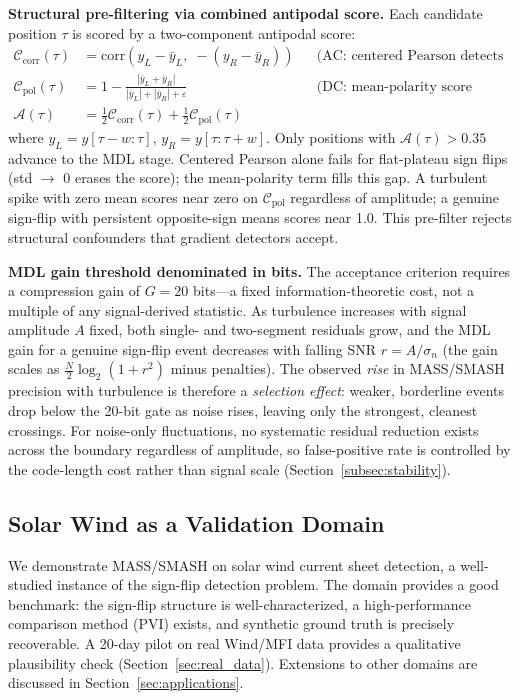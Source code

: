 \documentclass[12pt,letterpaper]{article}
\begin{document}
\textbf{Structural pre-filtering via combined antipodal score.}
Each candidate position $\tau$ is scored by a two-component antipodal score:
\begin{align*}
  \mathcal{C}_{\mathrm{corr}}(\tau) &= \mathrm{corr}(y_L - \bar{y}_L,\;{-}(y_R - \bar{y}_R))
    &&\text{(AC: centered Pearson detects oscillatory antipodal structure)}\\
  \mathcal{C}_{\mathrm{pol}}(\tau)  &= 1 - \tfrac{|\bar{y}_L + \bar{y}_R|}{|\bar{y}_L| + |\bar{y}_R| + \varepsilon}
    &&\text{(DC: mean-polarity score detects flat-plateau sign flips)}\\
  \mathcal{A}(\tau) &= \tfrac{1}{2}\mathcal{C}_{\mathrm{corr}}(\tau) + \tfrac{1}{2}\mathcal{C}_{\mathrm{pol}}(\tau)
\end{align*}
where $y_L = y[\tau-w:\tau]$, $y_R = y[\tau:\tau+w]$.
Only positions with $\mathcal{A}(\tau) > 0.35$ advance to the MDL stage.
Centered Pearson alone fails for flat-plateau sign flips (std $\to$ 0 erases
the score); the mean-polarity term fills this gap.
A turbulent spike with zero mean scores near zero on $\mathcal{C}_{\mathrm{pol}}$
regardless of amplitude; a genuine sign-flip with persistent opposite-sign
means scores near 1.0.
This pre-filter rejects structural confounders that gradient detectors accept.

\textbf{MDL gain threshold denominated in bits.}
The acceptance criterion requires a compression gain of $G = 20$ bits---a
fixed information-theoretic cost, not a multiple of any signal-derived
statistic.
As turbulence increases with signal amplitude $A$ fixed, both single- and
two-segment residuals grow, and the MDL gain for a genuine sign-flip event
decreases with falling SNR $r = A/\sigma_n$ (the gain scales as
$\tfrac{N}{2}\log_2(1+r^2)$ minus penalties).
The observed \emph{rise} in MASS/SMASH precision with turbulence is therefore
a \emph{selection effect}: weaker, borderline events drop below the 20-bit
gate as noise rises, leaving only the strongest, cleanest crossings.
For noise-only fluctuations, no systematic residual reduction exists across
the boundary regardless of amplitude, so false-positive rate is controlled
by the code-length cost rather than signal scale (Section~\ref{subsec:stability}).

\subsection{Solar Wind as a Validation Domain}

We demonstrate MASS/SMASH on solar wind current sheet detection, a
well-studied instance of the sign-flip detection problem.
The domain provides a good benchmark: the sign-flip structure is
well-characterized, a high-performance comparison method (PVI) exists, and
synthetic ground truth is precisely recoverable.
A 20-day pilot on real Wind/MFI data provides a qualitative plausibility
check (Section~\ref{sec:real_data}).
Extensions to other domains are discussed in
Section~\ref{sec:applications}.
\end{document}
